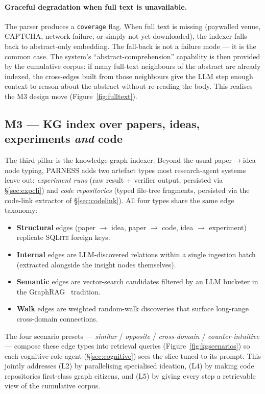 \documentclass{article}
\newcommand{\parness}{\textsf{PARNESS}}
\newcommand{\code}[1]{\texttt{\small #1}}
\begin{document}
\paragraph{Graceful degradation when full text is unavailable.} The
parser produces a \code{coverage} flag. When full text is missing
(paywalled venue, CAPTCHA, network failure, or simply not yet
downloaded), the indexer falls back to abstract-only embedding. The
fall-back is not a failure mode --- it is the common case. The system's
``abstract-comprehension'' capability is then provided by the
cumulative corpus: if many full-text neighbours of the abstract are
already indexed, the cross-edges built from those neighbours give the
LLM step enough context to reason about the abstract without re-reading
the body. This realises the M3 design move
(Figure~\ref{fig:fulltext}).

\subsection{M3 --- KG index over papers, ideas, experiments \emph{and} code}
\label{sec:method:kg}

The third pillar is the knowledge-graph indexer. Beyond the usual
paper$\to$idea node typing, \parness{} adds two artefact types most
research-agent systems leave out: \emph{experiment runs} (raw result +
verifier output, persisted via \S\ref{sec:expcli}) and \emph{code
repositories} (typed file-tree fragments, persisted via the code-link
extractor of \S\ref{sec:codelink}). All four types share the same
edge taxonomy:

\begin{itemize}[leftmargin=1.4em,itemsep=0.15em]
\item \textbf{Structural} edges (paper $\to$ idea, paper $\to$ code,
idea $\to$ experiment) replicate \textsc{SQLite} foreign keys.
\item \textbf{Internal} edges are LLM-discovered relations within a
single ingestion batch (extracted alongside the insight nodes
themselves).
\item \textbf{Semantic} edges are vector-search candidates filtered by
an LLM bucketer in the GraphRAG~\cite{graphrag,tigervector} tradition.
\item \textbf{Walk} edges are weighted random-walk discoveries that
surface long-range cross-domain connections.
\end{itemize}

The four scenario presets --- \emph{similar} / \emph{opposite} /
\emph{cross-domain} / \emph{counter-intuitive} --- compose these edge
types into retrieval queries (Figure~\ref{fig:kgscenarios}) so each
cognitive-role agent (\S\ref{sec:cognitive}) sees the slice tuned to
its prompt. This jointly addresses (L2) by parallelising specialised
ideation, (L4) by making code repositories first-class graph citizens,
and (L5) by giving every step a retrievable view of the cumulative
corpus.
\end{document}
